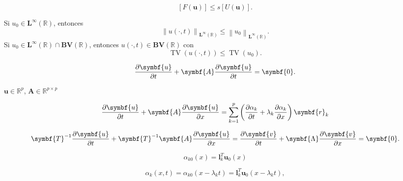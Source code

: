 \begin{equation*}
	\left[F\left(\symbf{u}\right)\right]\leq
	s\left[U\left(\symbf{u}\right)\right].
\end{equation*}

\begin{theorem}
	Si $u_{0}\in\symbf{L}^{\infty}\left(\mathbb{R}\right)$, entonces
	\begin{equation*}
		{\left\|
			u\left(\cdot, t\right)
			\right\|}_{\symbf{L}^{\infty}\left(\mathbb{R}\right)}
		\leq
		{\left\|u_{0}\right\|}_{\symbf{L}^{\infty}\left(\mathbb{R}\right)}.
	\end{equation*}
	Si
	\begin{math}
		u_{0}\in
		\symbf{L}^{\infty}
		\left(\mathbb{R}\right)\cap
		\symbf{BV}\left(\mathbb{R}\right)
	\end{math},
	entonces
	\begin{math}
		u\left(\cdot, t\right)\in
		\symbf{BV}\left(\mathbb{R}\right)
	\end{math}
	con
	\begin{equation*}
		\operatorname{TV}
		\left(u\left(\cdot, t\right)\right)\leq
		\operatorname{TV}
		\left(u_{0}\right).
	\end{equation*}
\end{theorem}

\begin{equation*}
	\diffp{\symbf{u}}{t}+
	\symbf{A}
	\diffp{\symbf{u}}{t}=
	\symbf{0}.
\end{equation*}

$\symbf{u}\in\mathbb{R}^{p}$, $\symbf{A}\in\mathbb{R}^{p\times p}$

\begin{equation*}
	\diffp{\symbf{u}}{t}+
	\symbf{A}
	\diffp{\symbf{u}}{x}=
	\sum_{k=1}^{p}
	\left(
	\diffp{\alpha_{k}}{t}+
	\lambda_{k}
	\diffp{\alpha_{k}}{x}
	\right)
	\symbf{r}_{k}
\end{equation*}

\begin{equation*}
	\symbf{T}^{-1}
	\diffp{\symbf{u}}{t}+
	\symbf{T}^{-1}
	\symbf{A}
	\diffp{\symbf{u}}{x}=
	\diffp{\symbf{v}}{t}+
	\symbf{\Lambda}\diffp{\symbf{v}}{x}=
	\symbf{0}.
\end{equation*}

\begin{equation*}
	\alpha_{k0}\left(x\right)=
	\symbf{l}^{T}_{k}
	\symbf{u}_{0}\left(x\right)
\end{equation*}

\begin{equation*}
	\alpha_{k}\left(x,t\right)=
	\alpha_{k0}\left(x-\lambda_{k}t\right)=
	\symbf{l}^{T}_{k}\symbf{u}_{0}\left(x-\lambda_{k}t\right),
\end{equation*}

